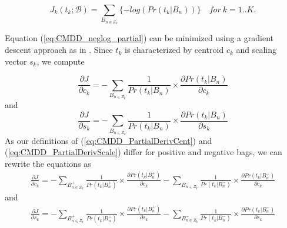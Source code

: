 \documentclass[12pt,dvips]{report}
\numberwithin{equation}{section}
\begin{document}
\begin{equation} \label{eq:CMDD_neglog_partial}
J_{k}(t_{k} ; \mathcal{B}) = \sum_{B_{n \in Z_{k}}}\{-log(Pr(t_{k}\vert B_{n}))\} \quad for\: k=1..K.
\end{equation}


Equation (\ref{eq:CMDD_neglog_partial}) can be minimized using a gradient descent approach as in \cite{maro98}.  Since $t_{k}$ is characterized by centroid $c_{k}$ and scaling vector $s_{k}$, we compute 

\begin{equation} \label{eq:CMDD_PartialDerivCent}
\frac{\partial J}{\partial c_{k}}=-\sum_{B_{n \in Z_{k}}}\frac{1}{Pr(t_{k}\vert B_{n})}\times\frac{\partial Pr(t_{k}\vert B_{n})}{\partial c_{k}}
\end{equation} and
\begin{equation} \label{eq:CMDD_PartialDerivScale}
\frac{\partial J}{\partial s_{k}}=-\sum_{B_{n \in Z_{k}}}\frac{1}{Pr(t_{k}\vert B_{n})}\times\frac{\partial Pr(t_{k}\vert B_{n})}{\partial s_{k}}
\end{equation} As our definitions of (\ref{eq:CMDD_PartialDerivCent}) and (\ref{eq:CMDD_PartialDerivScale}) differ for positive and negative bags, we can rewrite the equations as 
\begin{eqnarray}  \label{eq:CMDD_PartialDerivCentPosNeg}
\frac{\partial J}{\partial c_{k}} = -\sum_{B_{n \in Z_{k}}^{+}}\frac{1}{Pr(t_{k}\vert B_{n}^{+})}\times\frac{\partial Pr(t_{k}\vert B_{n}^{+})}{\partial c_{k}}
                                                     -\sum_{B_{n \in Z_{k}}^{-}}\frac{1}{Pr(t_{k}\vert B_{n}^{-})}\times\frac{\partial Pr(t_{k}\vert B_{n}^{-})}{\partial c_{k}}
\end{eqnarray}
and
\begin{eqnarray} \label{eq:CMDD_PartialDerivScalePosNeg}
\frac{\partial J}{\partial s_{k}} =  -\sum_{B_{n \in Z_{k}}^{+}}\frac{1}{Pr(t_{k}\vert B_{n}^{+})}\times\frac{\partial Pr(t_{k}\vert B_{n}^{+})}{\partial s_{k}}
                                                       -\sum_{B_{n \in Z_{k}}^{-}}\frac{1}{Pr(t_{k}\vert B_{n}^{-})}\times\frac{\partial Pr(t_{k}\vert B_{n}^{-})}{\partial s_{k}}
\end{eqnarray}
\end{document}

